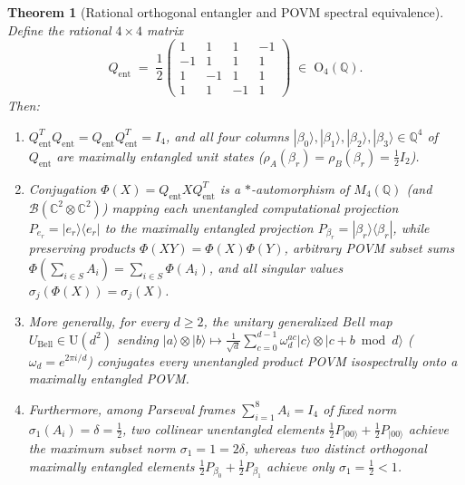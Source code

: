 \documentclass[11pt,a4paper]{article}
\theoremstyle{plain}
\newtheorem{theorem}{Theorem}[section]
\theoremstyle{definition}
\newcommand{\C}{\mathbb{C}}
\newcommand{\Q}{\mathbb{Q}}
\newcommand{\cB}{\mathcal{B}}
\newcommand{\Orth}{\mathrm{O}}
\begin{document}
\begin{theorem}[Rational orthogonal entangler and POVM spectral equivalence]
\label{thm:m2_qent}
Define the rational $4 \times 4$ matrix
\[
  Q_{\mathrm{ent}} \;=\; \frac{1}{2}\begin{pmatrix}
     1 &  1 &  1 & -1 \\
    -1 &  1 &  1 &  1 \\
     1 & -1 &  1 &  1 \\
     1 &  1 & -1 &  1
  \end{pmatrix} \;\in\; \Orth_4(\Q).
\]
Then:
\begin{enumerate}
  \item $Q_{\mathrm{ent}}^T Q_{\mathrm{ent}} = Q_{\mathrm{ent}} Q_{\mathrm{ent}}^T = I_4$, and all four columns $|\beta_0\rangle, |\beta_1\rangle, |\beta_2\rangle, |\beta_3\rangle \in \Q^4$ of $Q_{\mathrm{ent}}$ are maximally entangled unit states ($\rho_A(\beta_r) = \rho_B(\beta_r) = \frac{1}{2} I_2$).
  \item Conjugation $\Phi(X) = Q_{\mathrm{ent}} X Q_{\mathrm{ent}}^T$ is a $*$-automorphism of $M_4(\Q)$ (and $\cB(\C^2 \otimes \C^2)$) mapping each unentangled computational projection $P_{e_r} = |e_r\rangle\langle e_r|$ to the maximally entangled projection $P_{\beta_r} = |\beta_r\rangle\langle\beta_r|$, while preserving products $\Phi(XY) = \Phi(X)\Phi(Y)$, arbitrary POVM subset sums $\Phi(\sum_{i \in S} A_i) = \sum_{i \in S} \Phi(A_i)$, and all singular values $\sigma_j(\Phi(X)) = \sigma_j(X)$.
  \item More generally, for every $d \ge 2$, the unitary generalized Bell map $U_{\mathrm{Bell}} \in \mathrm{U}(d^2)$ sending $|a\rangle \otimes |b\rangle \mapsto \frac{1}{\sqrt{d}}\sum_{c=0}^{d-1} \omega_d^{ac} |c\rangle \otimes |c + b \bmod d\rangle$ ($\omega_d = e^{2\pi i/d}$) conjugates every unentangled product POVM isospectrally onto a maximally entangled POVM.
  \item Furthermore, among Parseval frames $\sum_{i=1}^8 A_i = I_4$ of fixed norm $\sigma_1(A_i) = \delta = \frac{1}{2}$, two collinear unentangled elements $\frac{1}{2}P_{|00\rangle} + \frac{1}{2}P_{|00\rangle}$ achieve the maximum subset norm $\sigma_1 = 1 = 2\delta$, whereas two distinct orthogonal maximally entangled elements $\frac{1}{2}P_{\beta_0} + \frac{1}{2}P_{\beta_1}$ achieve only $\sigma_1 = \frac{1}{2} < 1$.
\end{enumerate}
\end{theorem}
\end{document}
